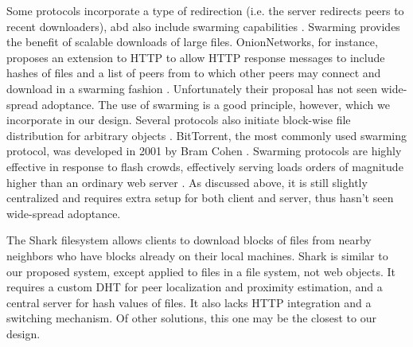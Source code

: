 {Some protocols incorporate a type of redirection (i.e. the server redirects peers to recent downloaders), abd also include swarming capabilities \cite{overhaul, webtorrent, onion}.  Swarming provides the benefit of scalable downloads of large files.  OnionNetworks, for instance, proposes an extension to HTTP to allow HTTP response messages to include hashes of files and a list of peers from to which other peers may connect and download in a swarming fashion \cite{onion}.  Unfortunately their proposal has not seen wide-spread adoptance.  The use of swarming is a good principle, however, which we incorporate in our design.  Several protocols also initiate block-wise file distribution for arbitrary objects \cite{zappala, cohen, slurpie, mutualcast, fastreplica, avalanche, bullet_prime}.  BitTorrent, the most commonly used swarming protocol, was developed in 2001 by Bram Cohen \cite{cohen}.  Swarming protocols are highly effective in response to flash crowds, effectively serving loads orders of magnitude higher than an ordinary web server \cite{zappala}. As discussed above, it is still slightly centralized and requires extra setup for both client and server, thus hasn't seen wide-spread adoptance.

The Shark \cite{shark} filesystem allows clients to download blocks of files from nearby neighbors who have blocks already on their local machines. 
Shark is similar to our proposed system, except applied to files in a file system, not web objects.  It  requires a custom DHT for peer localization and proximity estimation, and a central server for hash values of files.  It also lacks HTTP integration and a switching mechanism.  Of other solutions, this one may be the closest to our design.

}
